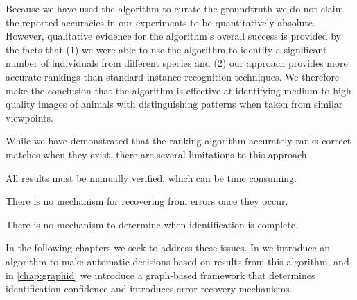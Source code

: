     Because we have used the algorithm to curate the groundtruth we do not claim the reported accuracies in our
    experiments to be quantitatively absolute. However, qualitative evidence for the algorithm's overall success is
    provided by the facts that (1) we were able to use the algorithm to identify a significant number of
    individuals from different species and (2) our approach provides more accurate rankings than standard instance
    recognition techniques. We therefore make the conclusion that the algorithm is effective at identifying medium
    to high quality images of animals with distinguishing patterns when taken from similar viewpoints.

    While we have demonstrated that the ranking algorithm accurately ranks correct matches when they exist, there
      are several limitations to this approach.
    \begin{enumln}
        \item All results must be manually verified, which can be time consuming.
        \item There is no mechanism for recovering from errors once they occur.
        \item There is no mechanism to determine when identification is complete.
    \end{enumln}
    In the following chapters we seek to address these issues.
    In  we introduce an algorithm to make automatic decisions based on results from this
      algorithm, and in \cref{chap:graphid} we introduce a graph-based framework that determines identification
      confidence and introduces error recovery mechanisms.

